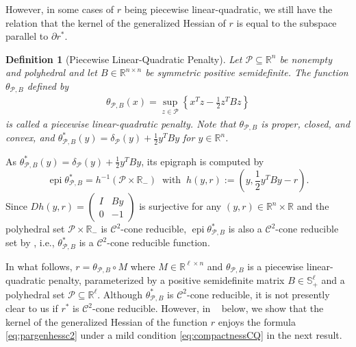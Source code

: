 \documentclass[reqno]{amsart}
\newtheorem{lemma}[proposition]{Lemma}
\newtheorem{definition}[proposition]{Definition}
\numberwithin{equation}{section}
\newcommand{\R}{\mathbb{R}}
\newcommand{\pol}{\mathcal{P}}
\newcommand{\tpb}{\theta_{\mathcal{P},B}}
\newcommand{\x}{\bar{x}}
\newcommand{\argmin}{\operatorname{argmin}}
\newcommand{\gph}{\operatorname{gph}}
\begin{document}
\noindent
However, in some cases of $r$ being piecewise linear-quadratic, we still have 
the relation that the kernel of the generalized Hessian of $r$ is equal to the subspace parallel to $\partial r^*$.

\begin{definition}[Piecewise Linear-Quadratic Penalty]
    Let $\pol \subseteq \R^{n}$ be nonempty and polyhedral and let $B \in \R^{n \times n}$ be symmetric positive semidefinite.
    The function $\tpb$ defined by \begin{align*}
        \tpb(x) = \sup_{z \in \pol} \left\{x^Tz - \frac{1}{2} z^TBz \right\}
    \end{align*} is called a \emph{piecewise linear-quadratic penalty}.
    Note that $\tpb$ is proper, closed, and convex, and $\tpb^*(y) = \delta_{\pol}(y) + \frac{1}{2} y^TBy$ for $y\in \R^n$.
\end{definition}


As $\tpb^*(y) = \delta_{\pol}(y) + \frac{1}{2} y^TBy$, its epigraph is computed by
\[
\operatorname{epi} \tpb^* =h^{-1}(\pol\times\R_-)\;\; \mbox{with}\;\; h(y,r):=\left(y,\frac{1}{2}y^TBy-r\right).
\]
Since  $D h(y,r)=\begin{pmatrix} I& By\\
0&-1\end{pmatrix}$ is surjective for any $(y,r)\in \R^n\times \R$ and the polyhedral set $\pol\times\R_-$ is  $\mathcal{C}^2$-cone reducible, $\operatorname{epi} \tpb^*$ is also a $\mathcal{C}^2$-cone reducible set by \cite[Proposition~3.2]{Sh03}, i.e., $\tpb^*$ is a $\mathcal{C}^2$-cone reducible function.



In what follows, $r = \tpb \circ M$ where $M \in \R^{\ell \times n}$ and $\tpb$ is a piecewise linear-quadratic penalty,
parameterized by a positive semidefinite matrix $B \in \mathbb{S}^{\ell}_{+}$ and a polyhedral set $\pol \subseteq \R^{\ell}$. Although  $\tpb^*$ is $\mathcal{C}^2$-cone reducible, it is not presently clear to us if $r^*$ is $\mathcal{C}^2$-cone reducible. However, in ~ below, we show that the kernel of the generalized Hessian of the function $r$ enjoys the formula \eqref{eq:pargenhessc2} under a mild condition \eqref{eq:compactnessCQ} in the next result. 

\end{document}
